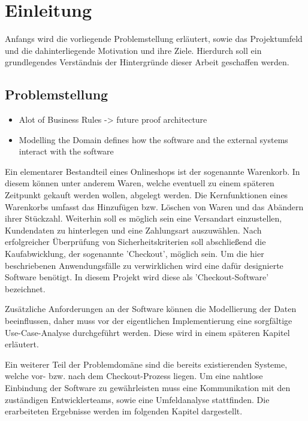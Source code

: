 

\chapter{Einleitung}

Anfangs wird die vorliegende Problemstellung erläutert, sowie das Projektumfeld und die dahinterliegende Motivation und ihre Ziele. Hierdurch soll ein grundlegendes Verständnis der Hintergründe dieser Arbeit geschaffen werden.

\section{Problemstellung}
\begin{itemize}[noitemsep,nolistsep]
	\item Alot of Business Rules -> future proof architecture
	\item Modelling the Domain defines how the software and the external systems interact with the software
\end{itemize}


Ein elementarer Bestandteil eines Onlineshops ist der sogenannte Warenkorb. In diesem können unter anderem Waren, welche eventuell zu einem späteren Zeitpunkt gekauft werden wollen, abgelegt werden. Die Kernfunktionen eines Warenkorbs umfasst das Hinzufügen bzw. Löschen von Waren und das Abändern ihrer Stückzahl. Weiterhin soll es möglich sein eine Versandart einzustellen, Kundendaten zu hinterlegen und eine Zahlungsart auszuwählen. Nach erfolgreicher Überprüfung von Sicherheitskriterien soll abschließend die Kaufabwicklung, der sogenannte 'Checkout', möglich sein. Um die hier beschriebenen Anwendungsfälle zu verwirklichen wird eine dafür designierte Software benötigt. In diesem Projekt wird diese als 'Checkout-Software' bezeichnet.
 
Zusätzliche Anforderungen an der Software können die Modellierung der Daten beeinflussen, daher muss vor der eigentlichen Implementierung eine sorgfältige Use-Case-Analyse durchgeführt werden. Diese wird in einem späteren Kapitel erläutert.

Ein weiterer Teil der Problemdomäne sind die bereits existierenden Systeme, welche vor- bzw. nach dem Checkout-Prozess liegen. Um eine nahtlose Einbindung der Software zu gewährleisten muss eine Kommunikation mit den zuständigen Entwicklerteams, sowie eine Umfeldanalyse stattfinden. Die erarbeiteten Ergebnisse werden im folgenden Kapitel dargestellt.



